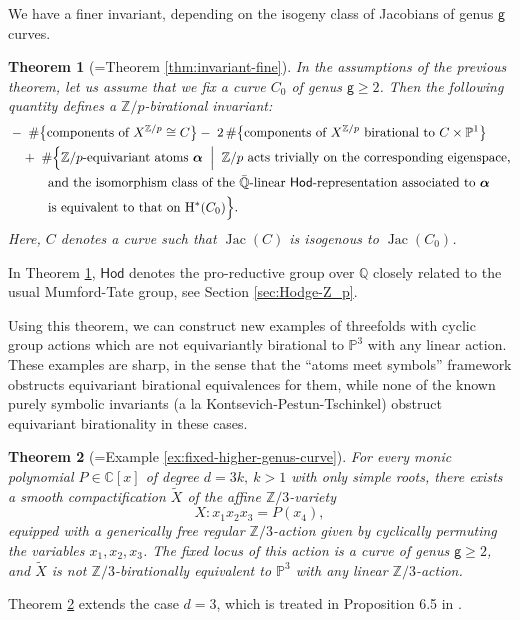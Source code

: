 \documentclass[12pt,a4paper]{amsart}
\newtheorem{Mtheorem}{Theorem}
\theoremstyle{definition}
\theoremstyle{remark}
\begin{document}
We have a finer invariant, depending on the isogeny class of Jacobians of genus $\mathsf  g$ curves.
\begin{Mtheorem}[=Theorem \ref{thm:invariant-fine}]\label{ithm:atoms-meet-symbols2}
In the assumptions of the previous theorem, let us assume
    that we fix a curve $C_0$ of genus \(\mathsf g\geq 2\). Then the following quantity defines a \(\mathbb{Z}/p\)-birational invariant:
\begin{equation}
\begin{split}
  &-\;\#\bigl\{
    \text{components of } X^{\mathbb{Z}/p} \cong C  
  \bigr\} 
   -\; 2\,\#\bigl\{
    \text{components of $X^{\mathbb{Z}/p}$ birational to } C \times \mathbb{P}^1  
  \bigr\} \\
  &\quad +\; \#\Bigl\{
    \mathbb{Z}/p\text{-equivariant atoms } \boldsymbol\alpha 
    \;\Bigm|\; 
    \mathbb{Z}/p \text{ acts trivially on the corresponding eigenspace,} \\
  &\qquad\quad 
    \text{and the isomorphism class of the } \bar{\mathbb{Q}}\text{-linear } 
    \mathsf{Hod}\text{-representation associated to } \boldsymbol\alpha \\
  &\qquad\quad 
    \text{is equivalent to that on } \mathrm{H}^{\ast}(C_0)
  \Bigr\}.
\end{split}
\end{equation}
Here, $C$ denotes a curve such that $\operatorname{Jac}(C)$ is isogenous to $\operatorname{Jac}(C_0)$.
\end{Mtheorem}

In Theorem \ref{ithm:atoms-meet-symbols2}, $\mathsf{Hod}$ denotes the pro-reductive group over $\mathbb Q$ closely related to the usual Mumford-Tate group, see Section  \ref{sec:Hodge-Z_p}.

Using this theorem, we can construct new examples of threefolds with cyclic group actions which are not equivariantly birational to $\mathbb P^3$ with any linear action. These examples are sharp, in the sense that the ``atoms meet symbols'' framework obstructs equivariant birational equivalences for them, while none of the known purely symbolic invariants (a la Kontsevich-Pestun-Tschinkel) obstruct equivariant birationality in these cases.
\begin{Mtheorem}[=Example \ref{ex:fixed-higher-genus-curve}]\label{Mtheorem:examples-higher-genus}
For every monic polynomial \(P \in \mathbb{C}[x]\) of degree \(d = 3k,~k>1\) with only simple roots, there exists a smooth compactification \(\widetilde{X}\) of the affine \(\mathbb{Z}/3\)-variety
\[
X: x_1x_2x_3 = P(x_4),
\]
equipped with a generically free regular \(\mathbb{Z}/3\)-action given by cyclically permuting the variables \(x_1, x_2, x_3\). The fixed locus of this action is a curve of genus \(\mathsf{g} \geq 2\), and \(\widetilde{X}\) is not \(\mathbb{Z}/3\)-birationally equivalent to \(\mathbb{P}^3\) with any linear \(\mathbb{Z}/3\)-action.
\end{Mtheorem}
Theorem \ref{Mtheorem:examples-higher-genus} extends the case $d=3$, which is treated in Proposition 6.5 in \cite{cheltsov2025equivariantgeometrysingularcubic}.
\end{document}
